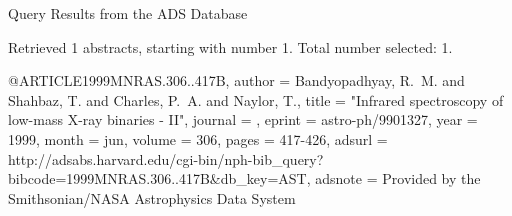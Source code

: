 Query Results from the ADS Database


Retrieved 1 abstracts, starting with number 1.  Total number selected: 1.

@ARTICLE{1999MNRAS.306..417B,
   author = {{Bandyopadhyay}, R.~M. and {Shahbaz}, T. and {Charles}, P.~A. and 
	{Naylor}, T.},
    title = "{Infrared spectroscopy of low-mass X-ray binaries - II}",
  journal = {\mnras},
   eprint = {astro-ph/9901327},
     year = 1999,
    month = jun,
   volume = 306,
    pages = {417-426},
   adsurl = {http://adsabs.harvard.edu/cgi-bin/nph-bib_query?bibcode=1999MNRAS.306..417B&db_key=AST},
  adsnote = {Provided by the Smithsonian/NASA Astrophysics Data System}
}


